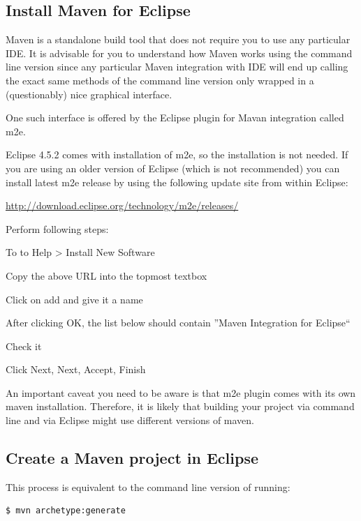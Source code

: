 \documentclass{article}
\newif\ifinstall
\begin{document}
\fi 

\subsection{Install Maven for Eclipse}

Maven is a standalone build tool that does not require you to use any
particular IDE. It is advisable for you to understand how Maven works
using the command line version since any particular Maven integration
with IDE will end up calling the exact same methods of the command
line version only wrapped in a (questionably) nice graphical interface.

One such interface is offered by the Eclipse plugin for Mavan
integration called m2e.

Eclipse 4.5.2 comes with installation of m2e, so the installation is
not needed. If you are using an older version of Eclipse (which is not
recommended) you can install latest m2e release by using the following
update site from within Eclipse: 

\url{http://download.eclipse.org/technology/m2e/releases/}

Perform following steps:
\begin{compactitem}
\item To to Help > Install New Software
\item Copy the above URL into the topmost textbox
\item Click on add and give it a name
\item After clicking OK, the list below should contain ''Maven Integration for Eclipse``
\item Check it
\item Click Next, Next, Accept, Finish
\end{compactitem}

An important caveat you need to be aware is that m2e plugin comes with
its own maven installation. Therefore, it is likely that building your
project via command line and via Eclipse might use different versions
of maven.

\ifinstall 
\else
\subsection{Create a Maven project in Eclipse}

This process is equivalent to the command line version of running:
\begin{lstlisting}
$ mvn archetype:generate 
\end{lstlisting}
\end{document}
